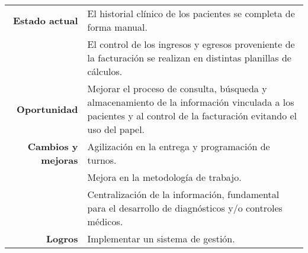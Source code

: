 \begin{tabular} {r p{12cm}}
    \toprule
    \textbf{Estado actual}     & El historial clínico de los pacientes se completa de forma manual. \\
                               & El control de los ingresos y egresos proveniente de la facturación se
                                 realizan en distintas planillas de cálculos. \\
                               \cmidrule{2-2}
    \textbf{Oportunidad}       & Mejorar el proceso de consulta, búsqueda y almacenamiento de la información
                                 vinculada a los pacientes y al control de la facturación evitando el uso del papel. \\
                               \cmidrule{2-2}
    \textbf{Cambios y mejoras} & Agilización en la entrega y programación de turnos. \\
                               & Mejora en la metodología de trabajo. \\
                               & Centralización de la información, fundamental para el desarrollo de diagnósticos
                                 y/o controles médicos. \\
                               \cmidrule{2-2}
    \textbf{Logros}            & Implementar un sistema de gestión. \\
    \bottomrule
    \end{tabular}
